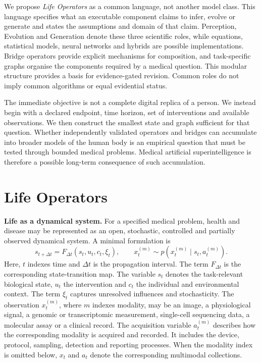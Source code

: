 \documentclass[12pt, letterpaper]{article} %
\begin{document}
We propose \emph{Life Operators} as a common language, not another model class. This language specifies what an executable component claims to infer, evolve or generate and states the assumptions and domain of that claim. Perception, Evolution and Generation denote these three scientific roles, while equations, statistical models, neural networks and hybrids are possible implementations. Bridge operators provide explicit mechanisms for composition, and task-specific graphs organise the components required by a medical question. This modular structure provides a basis for evidence-gated revision. Common roles do not imply common algorithms or equal evidential status.

The immediate objective is not a complete digital replica of a person. We instead begin with a declared endpoint, time horizon, set of interventions and available observations. We then construct the smallest state and graph sufficient for that question. Whether independently validated operators and bridges can accumulate into broader models of the human body is an empirical question that must be tested through bounded medical problems. Medical artificial superintelligence is therefore a possible long-term consequence of such accumulation.


\section{Life Operators}

\textbf{Life as a dynamical system.} For a specified medical problem, health and disease may be represented as an open, stochastic, controlled and partially observed dynamical system. A minimal formulation is
\begin{equation}
  s_{t+\Delta t}
  =
  F_{\Delta t}(s_t,u_t,c_t,\xi_t),
  \qquad
  x_t^{(m)}
  \sim
  p\!\left(x_t^{(m)}\mid s_t,a_t^{(m)}\right).
  \label{eq:state}
\end{equation}
Here, $t$ indexes time and $\Delta t$ is the propagation interval. The term $F_{\Delta t}$ is the corresponding state-transition map. The variable $s_t$ denotes the task-relevant biological state, $u_t$ the intervention and $c_t$ the individual and environmental context. The term $\xi_t$ captures unresolved influences and stochasticity. The observation $x_t^{(m)}$, where $m$ indexes modality, may be an image, a physiological signal, a genomic or transcriptomic measurement, single-cell sequencing data, a molecular assay or a clinical record. The acquisition variable $a_t^{(m)}$ describes how the corresponding modality is acquired and recorded. It includes the device, protocol, sampling, detection and reporting processes. When the modality index is omitted below, $x_t$ and $a_t$ denote the corresponding multimodal collections.
\end{document}
